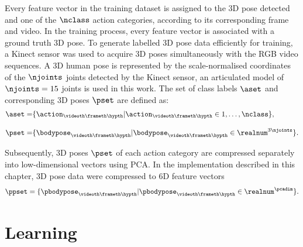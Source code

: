 Every feature vector in the training dataset is assigned to the 3D pose detected and one of the $\nclass$ action categories, according to its corresponding frame and video. 
In the training process, every feature vector is associated with a ground truth 3D pose.
To generate labelled 3D pose data efficiently for training, a Kinect sensor was used to acquire 3D poses simultaneously with the RGB video sequences. A 3D human pose is represented by the scale-normalised coordinates of the $\njoints$ joints detected by the Kinect sensor, an articulated model of $\njoints=15$ joints is used in this work. 
The set of class labels $\aset$ and corresponding 3D poses $\pset$ are defined as: 
\begin{equation}
	\begin{aligned}
		\aset = & \{\action_{\videoth\frameth\hypth} | \action_{\videoth\frameth\hypth} \in 1,\dots,\nclass \}, \\[3mm] 
		\pset = & \{\bodypose_{\videoth\frameth\hypth} | \bodypose_{\videoth\frameth\hypth} \in \realnum^{3\njoints}\}.
	\end{aligned}
\end{equation}

Subsequently, 3D poses $\pset$ of each action category are compressed separately into low-dimensional vectors using PCA. In the implementation described in this chapter, 3D pose data were compressed to 6D feature vectors
\begin{equation}
	\ppset = \{\pbodypose_{\videoth\frameth\hypth}  | \pbodypose_{\videoth\frameth\hypth} \in \realnum^{\pcadim} \}.
\end{equation}           

\section{Learning} 

